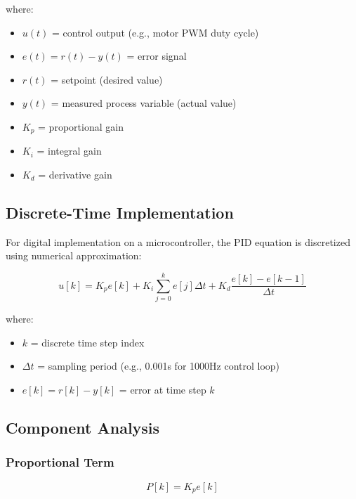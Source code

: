 \documentclass[11pt,a4paper]{article}
\begin{document}
where:
\begin{itemize}
  \item $u(t)$ = control output (e.g., motor PWM duty cycle)
  \item $e(t) = r(t) - y(t)$ = error signal
  \item $r(t)$ = setpoint (desired value)
  \item $y(t)$ = measured process variable (actual value)
  \item $K_p$ = proportional gain
  \item $K_i$ = integral gain
  \item $K_d$ = derivative gain
\end{itemize}

\subsection{Discrete-Time Implementation}

For digital implementation on a microcontroller, the PID equation is discretized using numerical approximation:

\begin{tcolorbox}[colback=green!5!white,colframe=green!75!black,title=Discrete PID Equation]
\begin{equation}
u[k] = K_p e[k] + K_i \sum_{j=0}^{k} e[j] \Delta t + K_d \frac{e[k] - e[k-1]}{\Delta t}
\end{equation}
\end{tcolorbox}

where:
\begin{itemize}
  \item $k$ = discrete time step index
  \item $\Delta t$ = sampling period (e.g., 0.001s for 1000Hz control loop)
  \item $e[k] = r[k] - y[k]$ = error at time step $k$
\end{itemize}

\subsection{Component Analysis}

\subsubsection{Proportional Term}

\begin{equation}
P[k] = K_p e[k]
\end{equation}
\end{document}

